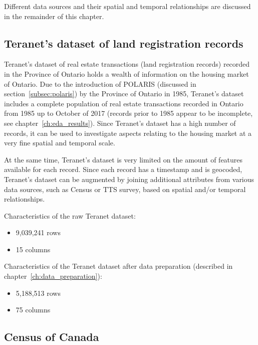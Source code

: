 Different data sources and their spatial and temporal relationships are discussed in the remainder of this chapter.

\subsection{Teranet's dataset of land registration records} \label{subsec:teranet_description}

Teranet's dataset\cite{TeranetEnterprisesInc.2011} of real estate transactions (land registration records) recorded in the Province of Ontario holds a wealth of information on the housing market of Ontario.
Due to the introduction of POLARIS (discussed in section~\ref{subsec:polaris}) by the Province of Ontario in 1985, Teranet's dataset includes a complete population of real estate transactions recorded in Ontario from 1985 up to October of 2017 (records prior to 1985 appear to be incomplete, see chapter~\ref{ch:eda_results}).
Since Teranet's dataset has a high number of records, it can be used to investigate aspects relating to the housing market at a very fine spatial and temporal scale.

At the same time, Teranet's dataset is very limited on the amount of features available for each record.
Since each record has a timestamp and is geocoded, Teranet's dataset can be augmented by joining additional attributes from various data sources, such as Census or TTS survey, based on spatial and/or temporal relationships.

\vspace{5mm}

Characteristics of the raw Teranet dataset:
\begin{itemize}
    \item 9,039,241 rows
    \item 15 columns
\end{itemize}

Characteristics of the Teranet dataset after data preparation (described in chapter~\ref{ch:data_preparation}):
\begin{itemize}
    \item 5,188,513 rows
    \item 75 columns
\end{itemize}

\subsection{Census of Canada} \label{subsec:census_description}

